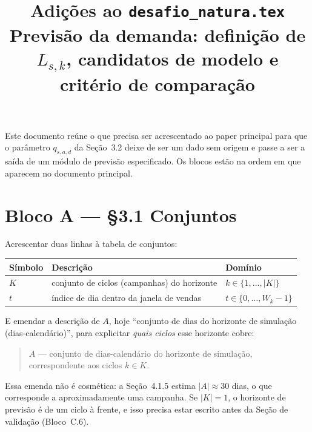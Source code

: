 \documentclass[11pt]{article}
\title{Adições ao \texttt{desafio\_natura.tex}\\[4pt]
\large Previsão da demanda: definição de $L_{s,k}$, candidatos de modelo
e critério de comparação}
\author{}
\date{}
\begin{document}
\maketitle

\noindent Este documento reúne o que precisa ser acrescentado ao paper
principal para que o parâmetro $q_{s,a,d}$ da Seção~3.2 deixe de ser um
dado sem origem e passe a ser a saída de um módulo de previsão
especificado. Os blocos estão na ordem em que aparecem no documento
principal.

\section*{Bloco A — §3.1 Conjuntos}

Acrescentar duas linhas à tabela de conjuntos:

\begin{center}
\begin{tabular}{@{}lll@{}}
\toprule
Símbolo & Descrição & Domínio \\
\midrule
$K$ & conjunto de ciclos (campanhas) do horizonte & $k \in \{1,\dots,|K|\}$ \\
$t$ & índice de dia dentro da janela de vendas & $t \in \{0,\dots,W_k-1\}$ \\
\bottomrule
\end{tabular}
\end{center}

\noindent E emendar a descrição de $A$, hoje ``conjunto de dias do
horizonte de simulação (dias-calendário)'', para explicitar \emph{quais
ciclos} esse horizonte cobre:

\begin{quote}
$A$ — conjunto de dias-calendário do horizonte de simulação,
correspondente aos ciclos $k \in K$.
\end{quote}

\noindent Essa emenda não é cosmética: a Seção~4.1.5 estima $|A| \approx
30$ dias, o que corresponde a aproximadamente uma campanha. Se $|K| = 1$,
o horizonte de previsão é de um ciclo à frente, e isso precisa estar
escrito antes da Seção de validação (Bloco~C.6).

\end{document}
